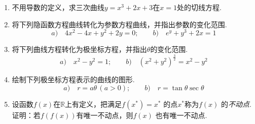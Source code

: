 \documentclass{article}
\begin{document}
\begin{enumerate}
\item 不用导数的定义，求三次曲线$y=x^{3}+2x+3$在$x=1$处的切线方程.
\item 将下列隐函数方程曲线转化为参数方程曲线，并指出参数的变化范围.
\[a)\quad 4x^{2}-4x+y^{2}+2y=0;\qquad b)\quad e^{y}+y^{3}+2x=1\]
\item 将下列曲线方程转化为极坐标方程，并指出$\theta$的变化范围.
\[a)\quad x^{2}-y^{2}=1;\qquad b)\quad (x^{2}+y^{2})^{\frac{3}{2}}=x^{2}-y^{2}\]
\item 绘制下列极坐标方程表示的曲线的图形.
\[a)\quad r=a\theta\,(a>0);\qquad b)\quad r=\tan\theta\sec\theta\]
\item 设函数$f(x)$在$\mathbb{R}$上有定义，把满足$f(x^{*})=x^{*}$ 的点$x^{*}$称为$f(x)$ 的\textit{不动点}. 证明：若$f(f(x))$有唯一不动点，则$f(x)$ 也有唯一不动点.
\end{enumerate}




















 
   
\end{document}
